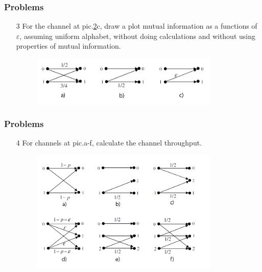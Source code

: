 \documentclass[14pt]{beamer}
\begin{document}
\begin{frame}
\frametitle{Problems}
\begin{enumerate} 
    
    \item[3]
    For the channel at pic.\ref{chan_ex}c, draw a plot mutual information as a functions of $\varepsilon $, assuming uniform alphabet, without doing calculations and without using properties of mutual information.
    
    \begin{figure}[ht]
    \begin{minipage}{1.0\linewidth}
    \includegraphics[width=0.85\textwidth]{fig5p_1.png}
    \label{chan_ex}
    \end{minipage}
    \end{figure}

\end{enumerate}
\end{frame}    
    
\begin{frame}
\frametitle{Problems}
\begin{enumerate}
    
    \item[4]
    For channels at pic.a-f, calculate the channel throughput.
    
    \begin{figure}[ht]
    \begin{minipage}{1.0\linewidth}
    \includegraphics[width=0.85\textwidth]{fig5p_2.png}
    \label{chan_ex}
    \end{minipage}
    \end{figure}

\end{enumerate}
\end{frame}
\end{document}
